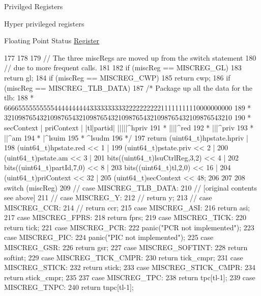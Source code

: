 Privilged Registers

Hyper privileged registers

Floating Point Status \hyperlink{classRegister}{Register} 


\begin{DoxyCode}
177 {
178 
179   // The three miscRegs are moved up from the switch statement
180   // due to more frequent calls.
181 
182   if (miscReg == MISCREG_GL)
183     return gl;
184   if (miscReg == MISCREG_CWP)
185     return cwp;
186   if (miscReg == MISCREG_TLB_DATA) {
187     /* Package up all the data for the tlb:
188      * 6666555555555544444444443333333333222222222211111111110000000000
189      * 3210987654321098765432109876543210987654321098765432109876543210
190      *   secContext   | priContext    |             |tl|partid|  |||||^hpriv
191      *                                                           ||||^red
192      *                                                           |||^priv
193      *                                                           ||^am
194      *                                                           |^lsuim
195      *                                                           ^lsudm
196      */
197     return      (uint64_t)hpstate.hpriv |
198                 (uint64_t)hpstate.red << 1 |
199                 (uint64_t)pstate.priv << 2 |
200                 (uint64_t)pstate.am << 3 |
201            bits((uint64_t)lsuCtrlReg,3,2) << 4 |
202            bits((uint64_t)partId,7,0) << 8 |
203            bits((uint64_t)tl,2,0) << 16 |
204                 (uint64_t)priContext << 32 |
205                 (uint64_t)secContext << 48;
206   }
207 
208     switch (miscReg) {
209       // case MISCREG_TLB_DATA:
210       //  [original contents see above]
211       // case MISCREG_Y:
212       //  return y;
213       // case MISCREG_CCR:
214       //  return ccr;
215       case MISCREG_ASI:
216         return asi;
217       case MISCREG_FPRS:
218         return fprs;
219       case MISCREG_TICK:
220         return tick;
221       case MISCREG_PCR:
222         panic("PCR not implemented\n");
223       case MISCREG_PIC:
224         panic("PIC not implemented\n");
225       case MISCREG_GSR:
226         return gsr;
227       case MISCREG_SOFTINT:
228         return softint;
229       case MISCREG_TICK_CMPR:
230         return tick_cmpr;
231       case MISCREG_STICK:
232         return stick;
233       case MISCREG_STICK_CMPR:
234         return stick_cmpr;
235 
237       case MISCREG_TPC:
238         return tpc[tl-1];
239       case MISCREG_TNPC:
240         return tnpc[tl-1];
}}
\end{DoxyCode}
